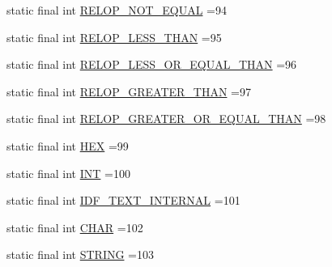 \begin{DoxyCompactItemize}
\item 
static final int \hyperlink{classgov_1_1nasa_1_1jpf_1_1inspector_1_1server_1_1expression_1_1parser_1_1_expression_grammar_lexer_af1a7a04119097474b165ebd5f187256a}{R\+E\+L\+O\+P\+\_\+\+N\+O\+T\+\_\+\+E\+Q\+U\+AL} =94
\item 
static final int \hyperlink{classgov_1_1nasa_1_1jpf_1_1inspector_1_1server_1_1expression_1_1parser_1_1_expression_grammar_lexer_a6f6781cb409bb609d36e9866bb63496c}{R\+E\+L\+O\+P\+\_\+\+L\+E\+S\+S\+\_\+\+T\+H\+AN} =95
\item 
static final int \hyperlink{classgov_1_1nasa_1_1jpf_1_1inspector_1_1server_1_1expression_1_1parser_1_1_expression_grammar_lexer_a99e8d6a45b49e79cdd1dde8392d1fe15}{R\+E\+L\+O\+P\+\_\+\+L\+E\+S\+S\+\_\+\+O\+R\+\_\+\+E\+Q\+U\+A\+L\+\_\+\+T\+H\+AN} =96
\item 
static final int \hyperlink{classgov_1_1nasa_1_1jpf_1_1inspector_1_1server_1_1expression_1_1parser_1_1_expression_grammar_lexer_a828a480355f27c4fd7e3ac5ed6971c6a}{R\+E\+L\+O\+P\+\_\+\+G\+R\+E\+A\+T\+E\+R\+\_\+\+T\+H\+AN} =97
\item 
static final int \hyperlink{classgov_1_1nasa_1_1jpf_1_1inspector_1_1server_1_1expression_1_1parser_1_1_expression_grammar_lexer_a6d69a34ecf32dd190ac2beadbe0e4821}{R\+E\+L\+O\+P\+\_\+\+G\+R\+E\+A\+T\+E\+R\+\_\+\+O\+R\+\_\+\+E\+Q\+U\+A\+L\+\_\+\+T\+H\+AN} =98
\item 
static final int \hyperlink{classgov_1_1nasa_1_1jpf_1_1inspector_1_1server_1_1expression_1_1parser_1_1_expression_grammar_lexer_ab1eb5dd585bad86900a7c312c79330cb}{H\+EX} =99
\item 
static final int \hyperlink{classgov_1_1nasa_1_1jpf_1_1inspector_1_1server_1_1expression_1_1parser_1_1_expression_grammar_lexer_ac6d3456fb9c0fe511697c0a0b8040426}{I\+NT} =100
\item 
static final int \hyperlink{classgov_1_1nasa_1_1jpf_1_1inspector_1_1server_1_1expression_1_1parser_1_1_expression_grammar_lexer_a21ccfa1d2dfe610131db85f3ef6d32f1}{I\+D\+F\+\_\+\+T\+E\+X\+T\+\_\+\+I\+N\+T\+E\+R\+N\+AL} =101
\item 
static final int \hyperlink{classgov_1_1nasa_1_1jpf_1_1inspector_1_1server_1_1expression_1_1parser_1_1_expression_grammar_lexer_ac8605f02557637cc65749d8896ae155f}{C\+H\+AR} =102
\item 
static final int \hyperlink{classgov_1_1nasa_1_1jpf_1_1inspector_1_1server_1_1expression_1_1parser_1_1_expression_grammar_lexer_a08d6959b195b53b2710eb6489f0c2908}{S\+T\+R\+I\+NG} =103
\item 

\end{DoxyCompactItemize}
